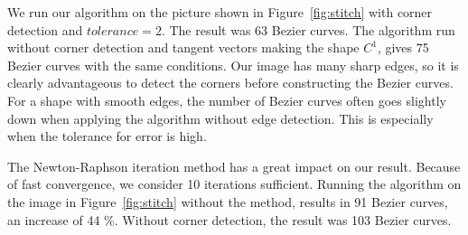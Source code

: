 \documentclass[10pt]{article}
\begin{document}
We run our algorithm on the picture shown in Figure~\ref{fig:stitch} with corner detection and $tolerance = 2$. The result was 63 Bezier curves. The algorithm run without corner detection and tangent vectors making the shape $C^1$, gives 75 Bezier curves with the same conditions. Our image has many sharp edges, so it is clearly advantageous to detect the corners before constructing the Bezier curves. For a shape with smooth edges, the number of Bezier curves often goes slightly down when applying the algorithm without edge detection. This is especially when the tolerance for error is high. 

The Newton-Raphson iteration method has a great impact on our result. Because of fast convergence, we consider 10 iterations sufficient. Running the algorithm on the image in Figure~\ref{fig:stitch} without the method, results in 91 Bezier curves, an increase of 44 $\%$. Without corner detection, the result was 103 Bezier curves. 
\end{document}
